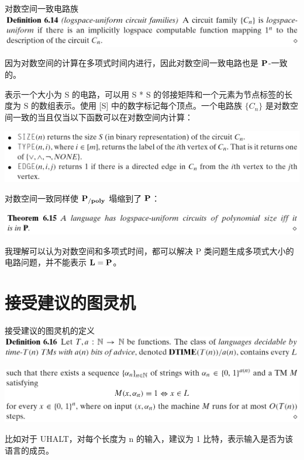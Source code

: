 \documentclass[UTF8,aspectratio=169,mathserif]{beamer}
\begin{document}
	\begin{frame}{对数空间一致电路族}
		\includegraphics[width=\linewidth]{../../5 & 6/note.assets/image-20210427151635788.png}\newline
		
		因为对数空间的计算在多项式时间内进行，因此对数空间一致电路也是 $\bf P$-一致的。
	\end{frame}
	\begin{frame}
		表示一个大小为 S 的电路，可以用 S * S 的邻接矩阵和一个元素为节点标签的长度为 S 的数组表示。使用 [S] 中的数字标记每个顶点。一个电路族 $\{C_n\}$ 是对数空间一致的当且仅当以下函数可以在对数空间内计算：\newline
		
		\includegraphics[width=\linewidth]{../../5 & 6/note.assets/image-20210427152140269.png}
	\end{frame}
	\begin{frame}
		对数空间一致同样使 $\bf P_{/poly}$ 塌缩到了 $\bf P$：\newline
		
		\includegraphics[width=\linewidth]{../../5 & 6/note.assets/image-20210427152252873.png}\newline
		
		我理解可以认为对数空间和多项式时间，都可以解决 P 类问题生成多项式大小的电路问题，并不能表示 $\bf L=P$。
	\end{frame}
	
	\section{接受建议的图灵机}
	\begin{frame}{接受建议的图灵机的定义}
		\includegraphics[width=\linewidth]{../../5 & 6/note.assets/image-20210427152508556.png}
	
		\includegraphics[width=\linewidth]{../../5 & 6/note.assets/image-20210427152516223.png}\newline
		
		比如对于 UHALT，对每个长度为 n 的输入，建议为 1 比特，表示输入是否为该语言的成员。
	\end{frame}
\end{document}
